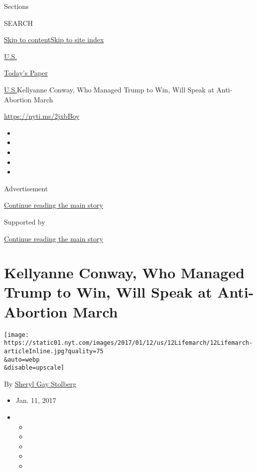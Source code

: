 Sections

SEARCH

\protect\hyperlink{site-content}{Skip to
content}\protect\hyperlink{site-index}{Skip to site index}

\href{https://www.nytimes.com/section/us}{U.S.}

\href{https://myaccount.nytimes.com/auth/login?response_type=cookie\&client_id=vi}{}

\href{https://www.nytimes.com/section/todayspaper}{Today's Paper}

\href{/section/us}{U.S.}\textbar{}Kellyanne Conway, Who Managed Trump to
Win, Will Speak at Anti-Abortion March

\url{https://nyti.ms/2jxbBoy}

\begin{itemize}
\item
\item
\item
\item
\item
\end{itemize}

Advertisement

\protect\hyperlink{after-top}{Continue reading the main story}

Supported by

\protect\hyperlink{after-sponsor}{Continue reading the main story}

\hypertarget{kellyanne-conway-who-managed-trump-to-win-will-speak-at-anti-abortion-march}{%
\section{Kellyanne Conway, Who Managed Trump to Win, Will Speak at
Anti-Abortion
March}\label{kellyanne-conway-who-managed-trump-to-win-will-speak-at-anti-abortion-march}}

\texttt{[image: https://static01.nyt.com/images/2017/01/12/us/12Lifemarch/12Lifemarch-articleInline.jpg?quality=75\\\&auto=webp\\\&disable=upscale]}

By \href{http://www.nytimes.com/by/sheryl-gay-stolberg}{Sheryl Gay
Stolberg}

\begin{itemize}
\item
  Jan. 11, 2017
\item
  \begin{itemize}
  \item
  \item
  \item
  \item
  \item
  \end{itemize}
\end{itemize}

